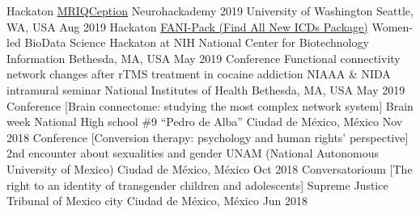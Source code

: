 \begin{cvproceedings}
    \cvproceeding
        {Hackaton}
        {\href{https://github.com/elizabethbeard/mriqception}{MRIQCeption}}
        {Neurohackademy 2019}
        {University of Washington}
        {Seattle, WA, USA}
        {Aug 2019}
    \cvproceeding
        {Hackaton}
        {\href{https://github.com/NCBI-Hackathons/Design-of-ICD-9-to-10-conversion-function-for-the-R-package-icd}{FANI-Pack (Find All New ICDs Package)}}
        {Women-led BioData Science Hackaton at NIH}
        {National Center for Biotechnology Information}
        {Bethesda, MA, USA}
        {May 2019}
    \cvproceeding
        {Conference}
        {Functional connectivity network changes after rTMS treatment in cocaine addiction}
        {NIAAA \& NIDA intramural seminar}
        {National Institutes of Health}
        {Bethesda, MA, USA}
        {May 2019}
    \cvproceeding
        {Conference}
        {[Brain connectome: studying the most complex network system]}
        {Brain week}
        {National High school \#9 ``Pedro de Alba''}
        {Ciudad de México, México}
        {Nov 2018}
    \cvproceeding
        {Conference}
        {[Conversion therapy: psychology and human rights' perspective]}
        {2nd encounter about sexualities and gender}
        {UNAM (National Autonomous University of Mexico)}
        {Ciudad de México, México}
        {Oct 2018}
    \cvproceeding
        {Conversatorioum}
        {[The right to an identity of transgender children and adolescents]}
        {}
        {Supreme Justice Tribunal of Mexico city}
        {Ciudad de México, México}
        {Jun 2018}
\end{cvproceedings}
